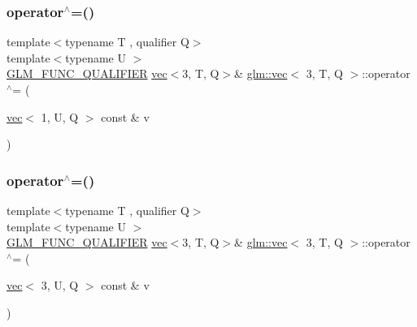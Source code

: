 \mbox{\label{structglm_1_1vec_3_013_00_01_t_00_01_q_01_4_af7af47fbde4d53045b59d69a7563eba7}} 
\subsubsection{\texorpdfstring{operator$^\wedge$=()}{operator^=()}\hspace{0.1cm}{\footnotesize\ttfamily [5/6]}}
{\footnotesize\ttfamily template$<$typename T , qualifier Q$>$ \\
template$<$typename U $>$ \\
\mbox{\hyperlink{setup_8hpp_a33fdea6f91c5f834105f7415e2a64407}{G\+L\+M\+\_\+\+F\+U\+N\+C\+\_\+\+Q\+U\+A\+L\+I\+F\+I\+ER}} \mbox{\hyperlink{structglm_1_1vec}{vec}}$<$3, T, Q$>$\& \mbox{\hyperlink{structglm_1_1vec}{glm\+::vec}}$<$ 3, T, Q $>$\+::operator$^\wedge$= (\begin{DoxyParamCaption}\item[{\mbox{\hyperlink{structglm_1_1vec}{vec}}$<$ 1, U, Q $>$ const \&}]{v }\end{DoxyParamCaption})}

\mbox{\label{structglm_1_1vec_3_013_00_01_t_00_01_q_01_4_abff32960a1defbf3301e8caa8c9fa1f6}} 
\subsubsection{\texorpdfstring{operator$^\wedge$=()}{operator^=()}\hspace{0.1cm}{\footnotesize\ttfamily [6/6]}}
{\footnotesize\ttfamily template$<$typename T , qualifier Q$>$ \\
template$<$typename U $>$ \\
\mbox{\hyperlink{setup_8hpp_a33fdea6f91c5f834105f7415e2a64407}{G\+L\+M\+\_\+\+F\+U\+N\+C\+\_\+\+Q\+U\+A\+L\+I\+F\+I\+ER}} \mbox{\hyperlink{structglm_1_1vec}{vec}}$<$3, T, Q$>$\& \mbox{\hyperlink{structglm_1_1vec}{glm\+::vec}}$<$ 3, T, Q $>$\+::operator$^\wedge$= (\begin{DoxyParamCaption}\item[{\mbox{\hyperlink{structglm_1_1vec}{vec}}$<$ 3, U, Q $>$ const \&}]{v }\end{DoxyParamCaption})}

